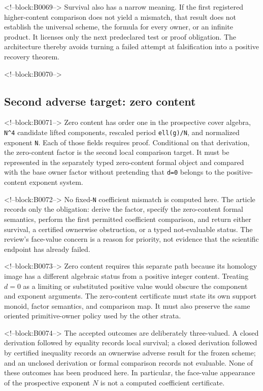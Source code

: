 \documentclass[11pt]{article}
\begin{document}
<!--block:B0069-->
Survival also has a narrow meaning. If the first registered
higher-content comparison does not yield a mismatch, that result does
not establish the universal scheme, the formula for every owner, or an
infinite product. It licenses only the next predeclared test or proof
obligation. The architecture thereby avoids turning a failed attempt at
falsification into a positive recovery theorem.

<!--block:B0070-->
\hypertarget{43-second-adverse-target-zero-content}{%
\subsection{Second adverse target: zero
content}\label{43-second-adverse-target-zero-content}}

<!--block:B0071-->
Zero content has order one in the prospective cover algebra,
\texttt{N\^{}4} candidate lifted components, rescaled period
\texttt{ell(g)/N}, and normalized exponent \texttt{N}. Each of those
fields requires proof. Conditional on that derivation, the zero-content
factor is the second local comparison target. It must be represented in
the separately typed zero-content formal object and compared with the
base owner factor without pretending that \texttt{d=0} belongs to the
positive-content exponent system.

<!--block:B0072-->
No fixed-\texttt{N} coefficient mismatch is computed here. The article
records only the obligation: derive the factor, specify the zero-content
formal semantics, perform the first permitted coefficient comparison,
and return either survival, a certified ownerwise obstruction, or a
typed not-evaluable status. The review's face-value concern is a reason
for priority, not evidence that the scientific endpoint has already
failed.

<!--block:B0073-->
Zero content requires this separate path because its homology image has
a different algebraic status from a positive integer content. Treating
$d=0$ as a limiting or substituted positive value would obscure the
component and exponent arguments. The zero-content certificate must
state its own support monoid, factor semantics, and comparison map. It
must also preserve the same oriented primitive-owner policy used by the
other strata.

<!--block:B0074-->
The accepted outcomes are deliberately three-valued. A closed
derivation followed by equality records local survival; a closed
derivation followed by certified inequality records an ownerwise
adverse result for the frozen scheme; and an unclosed derivation or
formal comparison records not evaluable. None of these outcomes has
been produced here. In particular, the face-value appearance of the
prospective exponent $N$ is not a computed coefficient certificate.
\end{document}
